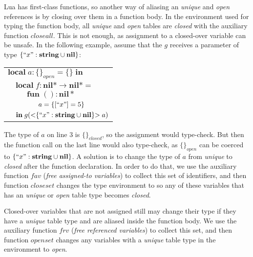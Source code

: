 \documentclass[preprint]{sigplanconf}
\newcommand{\Nil}{\mathbf{nil}}
\newcommand{\String}{\mathbf{string}}
\newcommand{\Void}{\Nil{*}}
\begin{document}
Lua has first-class functions, so another way of aliasing
an {\em unique} and {\em open} references is by closing
over them in a function body. In the environment used for
typing the function body, all {\em unique} and {\em open}
tables are {\em closed} with the auxiliary function $closeall$.
This is not enough, as assignment
to a closed-over variable can be unsafe. In the following
example, assume that the $g$ receives a parameter of type
$\{ ``x": \String \cup \Nil\}$:
\begin{center}
	\begin{tabular}{llll}
		\multicolumn{4}{l}{$\mathbf{local} \; a:\{\}_{open}
			= \{\} \; \mathbf{in}$}\\
		& \multicolumn{3}{l}{$\mathbf{local} \; f:\Void \rightarrow \Void =$}\\
		& & \multicolumn{2}{l}{$\mathbf{fun} \; ():\Void$}\\
		& & & \multicolumn{1}{l}{$a = \{[``x"]=5\} $}\\
		& \multicolumn{3}{l}{$\mathbf{in} \; g({<}\{``x":
			 \String \cup \Nil\}{>} \; a)$}
	\end{tabular}
\end{center}

The type of $a$ on line 3 is $\{\}_{closed}$, so the assignment
would type-check. But then the function call on the last line
would also type-check, as $\{\}_{open}$ can be coerced to
$\{ ``x": \String \cup \Nil\}$. A solution is to change the
type of $a$ from {\em unique} to {\em closed} after the function
declaration. In order to do that, we use the auxiliary function
$fav$ ({\em free assigned-to variables}) to collect this
set of identifiers, and then function $closeset$ changes
the type environment to so any of these variables that
has an {\em unique} or {\em open} table type becomes {\em closed}.

Closed-over variables that are not assigned still may
change their type if they have a {\em unique} table type
and are aliased inside the function body. We use the auxiliary
function $frv$ ({\em free referenced variables}) to collect
this set, and then function $openset$ changes any variables
with a {\em unique} table type in the environment to {\em open}.
\end{document}
